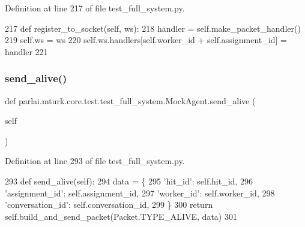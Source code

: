 Definition at line 217 of file test\+\_\+full\+\_\+system.\+py.


\begin{DoxyCode}
217     \textcolor{keyword}{def }register\_to\_socket(self, ws):
218         handler = self.make\_packet\_handler()
219         self.ws = ws
220         self.ws.handlers[self.worker\_id + self.assignment\_id] = handler
221 
\end{DoxyCode}
\mbox{\label{classparlai_1_1mturk_1_1core_1_1test_1_1test__full__system_1_1MockAgent_a7a0ba09a58ea21ac86db4b501c392a33}} 
\subsubsection{\texorpdfstring{send\+\_\+alive()}{send\_alive()}}
{\footnotesize\ttfamily def parlai.\+mturk.\+core.\+test.\+test\+\_\+full\+\_\+system.\+Mock\+Agent.\+send\+\_\+alive (\begin{DoxyParamCaption}\item[{}]{self }\end{DoxyParamCaption})}



Definition at line 293 of file test\+\_\+full\+\_\+system.\+py.


\begin{DoxyCode}
293     \textcolor{keyword}{def }send\_alive(self):
294         data = \{
295             \textcolor{stringliteral}{'hit\_id'}: self.hit\_id,
296             \textcolor{stringliteral}{'assignment\_id'}: self.assignment\_id,
297             \textcolor{stringliteral}{'worker\_id'}: self.worker\_id,
298             \textcolor{stringliteral}{'conversation\_id'}: self.conversation\_id,
299         \}
300         \textcolor{keywordflow}{return} self.build\_and\_send\_packet(Packet.TYPE\_ALIVE, data)
301 
\end{DoxyCode}
\mbox{\label{classparlai_1_1mturk_1_1core_1_1test_1_1test__full__system_1_1MockAgent_a42f7589517cdf4c6a10b9a80e9afea1a}} 
